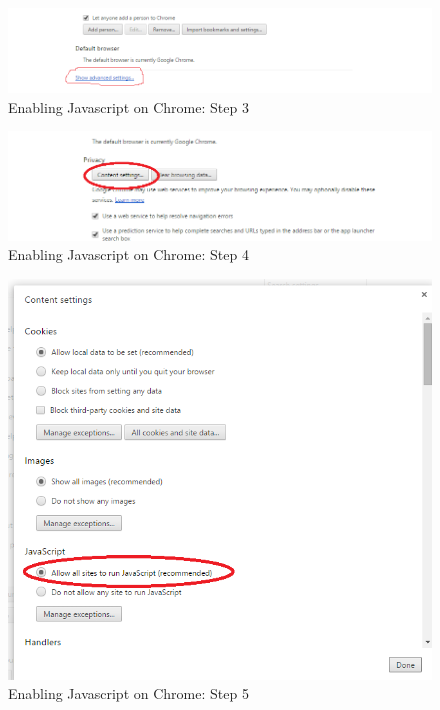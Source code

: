		\begin{figure}[!h]
		\centering
			\includegraphics[scale=0.5]{images/javascriptChrome3.png}
			\caption{Enabling Javascript on Chrome: Step 3}
		\end{figure}
		
		\begin{figure}[!h]
		\centering
			\includegraphics[scale=0.5]{images/javascriptChrome4.png}
			\caption{Enabling Javascript on Chrome: Step 4}
		\end{figure}
		
		\begin{figure}[!h]
		\centering
			\includegraphics[scale=0.5]{images/javascriptChrome5.png}
			\caption{Enabling Javascript on Chrome: Step 5}
		\end{figure}
	
